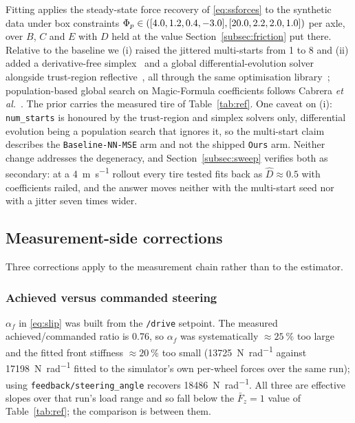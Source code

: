 Fitting applies the steady-state force recovery of \eqref{eq:ssforces} to the
synthetic data under box constraints
$\Phi_{p}\in([4.0,1.2,0.4,-3.0],[20.0,2.2,2.0,1.0])$ per axle, over $B$, $C$ and
$E$ with $D$ held at the value Section~\ref{subsec:friction} put there.
Relative to the baseline we (i) raised the jittered multi-starts from 1 to 8
and (ii) added a derivative-free simplex~\cite{neldermead1965} and a global
differential-evolution solver~\cite{storn1997de} alongside trust-region
reflective~\cite{branch1999trust}, all through the same optimisation
library~\cite{virtanen2020scipy}; population-based global search on
Magic-Formula coefficients follows Cabrera \emph{et
al.}~\cite{cabrera2004genetic}. The prior carries the measured tire of
Table~\ref{tab:ref}. One caveat on (i): \texttt{num\_starts} is honoured by the
trust-region and simplex solvers only, differential evolution being a
population search that ignores it, so the multi-start claim describes the
\texttt{Baseline-NN-MSE} arm and not the shipped \texttt{Ours} arm. Neither
change addresses the degeneracy, and Section~\ref{subsec:sweep} verifies both
as secondary: at a \SI{4}{\meter\per\second} rollout every tire tested fits
back as $\hat D\approx\num{0.5}$ with coefficients railed, and the answer moves
neither with the multi-start seed nor with a jitter seven times wider.

\subsection{Measurement-side corrections}
\label{subsec:measurement}

Three corrections apply to the measurement chain rather than to the estimator.

\subsubsection{Achieved versus commanded steering}
$\alpha_{f}$ in \eqref{eq:slip} was built from the \texttt{/drive} setpoint.
The measured achieved/commanded ratio is \num{0.76}, so $\alpha_{f}$ was
systematically $\approx\SI{25}{\percent}$ too large and the fitted front
stiffness $\approx\SI{20}{\percent}$ too small
(\SI{13725}{\newton\per\radian} against \SI{17198}{\newton\per\radian} fitted
to the simulator's own per-wheel forces over the same run); using
\texttt{feedback/\allowbreak steering\_angle} recovers
\SI{18486}{\newton\per\radian}. All three are effective slopes over that run's
load range and so fall below the $\bar F_{z}=1$ value of Table~\ref{tab:ref};
the comparison is between them.

